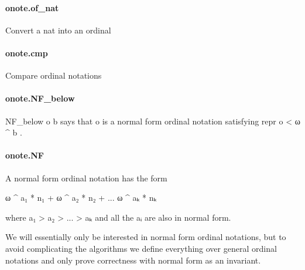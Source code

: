 \documentclass{article}
\begin{document}
\paragraph{onote.of\_nat}
\par
Convert a 
\colorbox[RGB]{253,246,227}{{{{\color[RGB]{101, 123, 131} nat }}}} into an ordinal
\paragraph{onote.cmp}
\par
Compare ordinal notations
\paragraph{onote.NF\_below}
\par
\colorbox[RGB]{253,246,227}{{{{\color[RGB]{101, 123, 131} NF\_below o b }}}} says that 
\colorbox[RGB]{253,246,227}{{{{\color[RGB]{101, 123, 131} o }}}} is a normal form ordinal notation
satisfying 
\colorbox[RGB]{253,246,227}{{{{\color[RGB]{101, 123, 131} repr o  }}}{{{\color[RGB]{181, 137, 0} < }}}{{{\color[RGB]{101, 123, 131}  ω \textasciicircum{} b }}}}.
\paragraph{onote.NF}
\par
A normal form ordinal notation has the form
\\
\colorbox[RGB]{253,246,227}{\parbox{4.5in}{{{{\color[RGB]{101, 123, 131} ω \textasciicircum{} a₁  }}}{{{\color[RGB]{181, 137, 0} * }}}{{{\color[RGB]{101, 123, 131}  n₁  }}}{{{\color[RGB]{181, 137, 0} + }}}{{{\color[RGB]{101, 123, 131}  ω \textasciicircum{} a₂  }}}{{{\color[RGB]{181, 137, 0} * }}}{{{\color[RGB]{101, 123, 131}  n₂  }}}{{{\color[RGB]{181, 137, 0} + }}}{{{\color[RGB]{101, 123, 131}  ... ω \textasciicircum{} aₖ  }}}{{{\color[RGB]{181, 137, 0} * }}}{{{\color[RGB]{101, 123, 131}  nₖ
 }}}\\

}}\par
where 
\colorbox[RGB]{253,246,227}{{{{\color[RGB]{101, 123, 131} a₁  }}}{{{\color[RGB]{181, 137, 0} > }}}{{{\color[RGB]{101, 123, 131}  a₂  }}}{{{\color[RGB]{181, 137, 0} > }}}{{{\color[RGB]{101, 123, 131}  ...  }}}{{{\color[RGB]{181, 137, 0} > }}}{{{\color[RGB]{101, 123, 131}  aₖ }}}} and all the 
\colorbox[RGB]{253,246,227}{{{{\color[RGB]{101, 123, 131} aᵢ }}}} are
also in normal form.
\par
We will essentially only be interested in normal form
ordinal notations, but to avoid complicating the algorithms
we define everything over general ordinal notations and
only prove correctness with normal form as an invariant.
\end{document}
